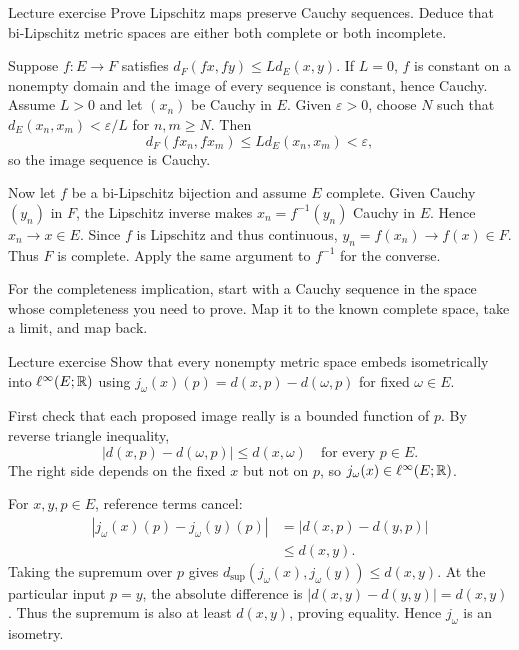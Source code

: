 \begin{exam}{Lecture exercise}
Prove Lipschitz maps preserve Cauchy sequences. Deduce that bi-Lipschitz metric spaces are either both complete or both incomplete.
\end{exam}
\begin{answer}
Suppose $f:E\to F$ satisfies $d_F(fx,fy)\le Ld_E(x,y)$. If $L=0$, $f$ is constant on a nonempty domain and the image of every sequence is constant, hence Cauchy. Assume $L>0$ and let $(x_n)$ be Cauchy in $E$. Given $\varepsilon>0$, choose $N$ such that $d_E(x_n,x_m)<\varepsilon/L$ for $n,m\ge N$. Then
\[d_F(fx_n,fx_m)\le Ld_E(x_n,x_m)<\varepsilon,\]
so the image sequence is Cauchy.

Now let $f$ be a bi-Lipschitz bijection and assume $E$ complete. Given Cauchy $(y_n)$ in $F$, the Lipschitz inverse makes $x_n=f^{-1}(y_n)$ Cauchy in $E$. Hence $x_n\to x\in E$. Since $f$ is Lipschitz and thus continuous, $y_n=f(x_n)\to f(x)\in F$. Thus $F$ is complete. Apply the same argument to $f^{-1}$ for the converse.
\end{answer}
\begin{tip}
For the completeness implication, start with a Cauchy sequence in the space whose completeness you need to prove. Map it to the known complete space, take a limit, and map back.
\end{tip}
\begin{exam}{Lecture exercise}
Show that every nonempty metric space embeds isometrically into $\ell^\infty(E;\mathbb R)$ using $j_\omega(x)(p)=d(x,p)-d(\omega,p)$ for fixed $\omega\in E$.
\end{exam}
\begin{answer}
First check that each proposed image really is a bounded function of $p$. By reverse triangle inequality,
\[|d(x,p)-d(\omega,p)|\le d(x,\omega)\quad\text{for every }p\in E.\]
The right side depends on the fixed $x$ but not on $p$, so $j_\omega(x)\in\ell^\infty(E;\mathbb R)$.

For $x,y,p\in E$, reference terms cancel:
\begin{align*}
|j_\omega(x)(p)-j_\omega(y)(p)|&=|d(x,p)-d(y,p)|\\
&\le d(x,y).
\end{align*}
Taking the supremum over $p$ gives $d_{\sup}(j_\omega(x),j_\omega(y))\le d(x,y)$. At the particular input $p=y$, the absolute difference is $|d(x,y)-d(y,y)|=d(x,y)$. Thus the supremum is also at least $d(x,y)$, proving equality. Hence $j_\omega$ is an isometry.
\end{answer}
